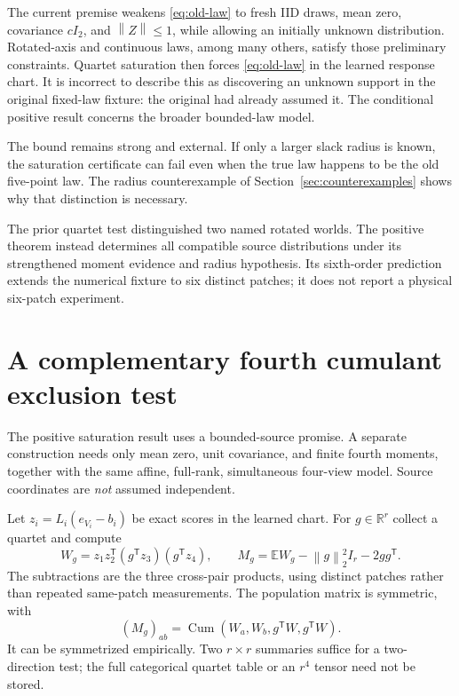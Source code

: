 \documentclass[11pt]{article}
\theoremstyle{definition}
\theoremstyle{remark}
\newcommand{\R}{\mathbb R}
\newcommand{\E}{\mathbb E}
\newcommand{\Cum}{\operatorname{Cum}}
\newcommand{\trans}{\mathsf T}
\newcommand{\norm}[1]{\left\lVert#1\right\rVert}
\begin{document}
The current premise weakens \eqref{eq:old-law} to fresh IID draws, mean
zero, covariance $cI_2$, and $\norm{Z}\le1$, while allowing an initially
unknown distribution. Rotated-axis and continuous laws, among many
others, satisfy those preliminary constraints. Quartet saturation then
forces \eqref{eq:old-law} in the learned response chart. It is incorrect
to describe this as discovering an unknown support in the original
fixed-law fixture: the original had already assumed it. The conditional
positive result concerns the broader bounded-law model.

The bound remains strong and external. If only a larger slack radius is
known, the saturation certificate can fail even when the true law happens
to be the old five-point law. The radius counterexample of
Section~\ref{sec:counterexamples} shows why that distinction is necessary.

The prior quartet test distinguished two named rotated worlds. The
positive theorem instead determines all compatible source distributions
under its strengthened moment evidence and radius hypothesis. Its
sixth-order prediction extends the numerical fixture to six distinct
patches; it does not report a physical six-patch experiment.

\section{A complementary fourth cumulant exclusion test}
\label{sec:commutator}

The positive saturation result uses a bounded-source promise. A separate
construction needs only mean zero, unit covariance, and finite fourth
moments, together with the same affine, full-rank, simultaneous four-view
model. Source coordinates are \emph{not} assumed independent.

Let $z_i=L_i(e_{V_i}-b_i)$ be exact scores in the learned chart. For
$g\in\R^r$ collect a quartet and compute
\begin{equation}
W_g=z_1z_2^\trans(g^\trans z_3)(g^\trans z_4),
\qquad
M_g=\E W_g-\norm g_2^2I_r-2gg^\trans.
\label{eq:commutator-stat}
\end{equation}
The subtractions are the three cross-pair products, using distinct
patches rather than repeated same-patch measurements. The population
matrix is symmetric, with
\begin{equation}
(M_g)_{ab}=\Cum(W_a,W_b,g^\trans W,g^\trans W).
\label{eq:cumulant-contraction}
\end{equation}
It can be symmetrized empirically. Two $r\times r$ summaries suffice for
a two-direction test; the full categorical quartet table or an $r^4$
tensor need not be stored.
\end{document}
